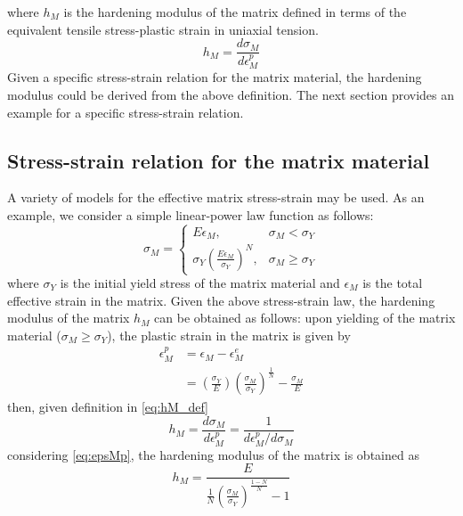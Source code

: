 where $h_M$ is the hardening modulus of the matrix defined in terms of the equivalent tensile stress-plastic strain in uniaxial tension.
\begin{equation}\label{eq:hM_def}
 h_M = \frac{d\sigma_M}{d\epsilon^p_M}
\end{equation}
Given a specific stress-strain relation for the matrix material, the
hardening modulus could be derived from the above definition. The next
section provides an example for a specific stress-strain relation.

\subsection{Stress-strain relation for the matrix material}
A variety of models for the effective matrix stress-strain may be
used. As an example, we consider a simple linear-power law function as
follows:
\begin{equation}\label{eq:sigM_epsM}
\sigma_M =
	\begin{cases}
	E\epsilon_M,  &\sigma_M < \sigma_Y \\
	\sigma_Y \left( \frac{E\epsilon_M}{\sigma_Y} \right)^N,  & \sigma_M \geq \sigma_Y 
	\end{cases}
\end{equation}
where $\sigma_Y$ is the initial yield stress of the matrix material
and $\epsilon_M$ is the total effective strain in the matrix. Given
the above stress-strain law, the hardening modulus of the matrix $h_M$
can be obtained as follows: upon yielding of the matrix material
($\sigma_M \geq \sigma_Y$), the plastic strain in the matrix is given
by
\begin{equation}\label{eq:epsMp}
	\begin{aligned}
	\epsilon^p_M &= \epsilon_M - \epsilon^e_M \\
					   &=  \left( \frac{\sigma_Y}{E}\right) \left( \frac{\sigma_M}{\sigma_Y} \right) ^{\frac{1}{N}} - \frac{\sigma_M}{E}
	\end{aligned}
\end{equation}
then, given definition in \eqref{eq:hM_def}
\begin{equation}
h_M = \frac{d\sigma_M}{d\epsilon^p_M} = \frac{1}{d\epsilon^p_M / d\sigma_M}
\end{equation}
considering \eqref{eq:epsMp}, the hardening modulus of the matrix is obtained as
\begin{equation}\label{eq:hM}
h_M = \frac{E}{ \frac{1}{N} \left( \frac{\sigma_M}{\sigma_Y} \right)^{\frac{1-N}{N}} - 1}
\end{equation}

